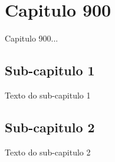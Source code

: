 
\chapter{Capitulo 900}

Capitulo 900...


\section{Sub-capitulo 1}
Texto do sub-capitulo 1

\section{Sub-capitulo 2}
Texto do sub-capitulo 2

